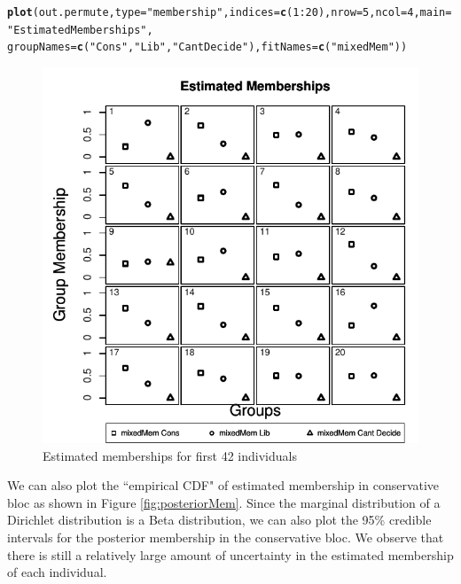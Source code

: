 \documentclass{article}\usepackage[]{graphicx}\usepackage[]{color}
\makeatletter
\def\maxwidth{ %
  \ifdim\Gin@nat@width>\linewidth
    \linewidth
  \else
    \Gin@nat@width
  \fi
}
\newcommand{\hlnum}[1]{\textcolor[rgb]{0.686,0.059,0.569}{#1}}%
\newcommand{\hlstr}[1]{\textcolor[rgb]{0.192,0.494,0.8}{#1}}%
\newcommand{\hlopt}[1]{\textcolor[rgb]{0,0,0}{#1}}%
\newcommand{\hlstd}[1]{\textcolor[rgb]{0.345,0.345,0.345}{#1}}%
\newcommand{\hlkwc}[1]{\textcolor[rgb]{0.333,0.667,0.333}{#1}}%
\newcommand{\hlkwd}[1]{\textcolor[rgb]{0.737,0.353,0.396}{\textbf{#1}}}%
\newenvironment{kframe}{%
 \def\at@end@of@kframe{}%
 \ifinner\ifhmode%
  \def\at@end@of@kframe{\end{minipage}}%
  \begin{minipage}{\columnwidth}%
 \fi\fi%
 \def\FrameCommand##1{\hskip\@totalleftmargin \hskip-\fboxsep
 \colorbox{shadecolor}{##1}\hskip-\fboxsep
     \hskip-\linewidth \hskip-\@totalleftmargin \hskip\columnwidth}%
 \MakeFramed {\advance\hsize-\width
   \@totalleftmargin\z@ \linewidth\hsize
   \@setminipage}}%
 {\par\unskip\endMakeFramed%
 \at@end@of@kframe}
\newenvironment{knitrout}{}{} %
\renewenvironment{knitrout}{\begin{singlespace}}{\end{singlespace}}
\makeatother
\begin{document}
\begin{knitrout}
\color{fgcolor}\begin{kframe}
\begin{alltt}
\hlkwd{plot}\hlstd{(out.permute,} \hlkwc{type} \hlstd{=} \hlstr{"membership"}\hlstd{,} \hlkwc{indices} \hlstd{=} \hlkwd{c}\hlstd{(}\hlnum{1}\hlopt{:}\hlnum{20}\hlstd{),} \hlkwc{nrow} \hlstd{=} \hlnum{5}\hlstd{,} \hlkwc{ncol} \hlstd{=} \hlnum{4}\hlstd{,} \hlkwc{main} \hlstd{=} \hlstr{"Estimated Memberships"}\hlstd{,}
     \hlkwc{groupNames} \hlstd{=} \hlkwd{c}\hlstd{(}\hlstr{"Cons"}\hlstd{,} \hlstr{"Lib"}\hlstd{,} \hlstr{"Cant Decide"}\hlstd{),} \hlkwc{fitNames} \hlstd{=} \hlkwd{c}\hlstd{(}\hlstr{"mixedMem"}\hlstd{))}
\end{alltt}
\end{kframe}\begin{figure}

{\centering \includegraphics[width=\maxwidth]{figure/mems-1} 

}

\caption[Estimated memberships for first 42 individuals]{Estimated memberships for first 42 individuals}\label{fig:mems}
\end{figure}


\end{knitrout}
We can also plot the ``empirical CDF" of estimated membership in conservative bloc as shown in Figure \ref{fig:posteriorMem}. Since the marginal distribution of a Dirichlet distribution is a Beta distribution, we can also plot the 95\% credible intervals for the posterior membership in the conservative bloc. We observe that there is still a relatively large amount of uncertainty in the estimated membership of each individual.
\end{document}
